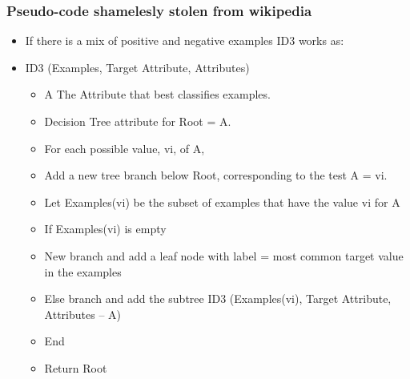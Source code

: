 \begin{frame}
\frametitle{Pseudo-code shamelesly stolen from wikipedia}
\begin{itemize}
	\item If there is a mix of positive and negative examples ID3 works as:
	\item ID3 (Examples, Target Attribute, Attributes)
	\begin{itemize}
	

     \item   A  The Attribute that best classifies examples.
      \item  Decision Tree attribute for Root = A.
      \item  For each possible value, vi, of A,
      \item   Add a new tree branch below Root, corresponding to the test A = vi.
       \item Let Examples(vi) be the subset of examples that have the value vi for A
      \item If Examples(vi) is empty
     \item   New branch and add a leaf node with label = most common target value in the examples
   \item  Else branch and add the subtree ID3 (Examples(vi), Target Attribute, Attributes – {A})
   \item  End
   \item  Return Root

	\end{itemize}
		\end{itemize}


\end{frame}